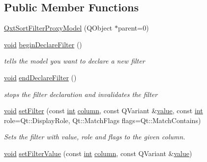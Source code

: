 \subsection*{Public Member Functions}
\begin{DoxyCompactItemize}
\item 
\hyperlink{class_qxt_sort_filter_proxy_model_acaf9aa94aadd029fc7888c5e70bcc32e}{Qxt\-Sort\-Filter\-Proxy\-Model} (Q\-Object $\ast$parent=0)
\item 
\hyperlink{group___u_a_v_objects_plugin_ga444cf2ff3f0ecbe028adce838d373f5c}{void} \hyperlink{class_qxt_sort_filter_proxy_model_aed9d7acfa357bec84ba07df45034c284}{begin\-Declare\-Filter} ()
\begin{DoxyCompactList}\small\item\em tells the model you want to declare a new filter \end{DoxyCompactList}\item 
\hyperlink{group___u_a_v_objects_plugin_ga444cf2ff3f0ecbe028adce838d373f5c}{void} \hyperlink{class_qxt_sort_filter_proxy_model_a17ba119b09788b58bcc08211fa6c3b81}{end\-Declare\-Filter} ()
\begin{DoxyCompactList}\small\item\em stops the filter declaration and invalidates the filter \end{DoxyCompactList}\item 
\hyperlink{group___u_a_v_objects_plugin_ga444cf2ff3f0ecbe028adce838d373f5c}{void} \hyperlink{class_qxt_sort_filter_proxy_model_ab256bfa0285cd326e6e6dbf6b4474b06}{set\-Filter} (const \hyperlink{ioapi_8h_a787fa3cf048117ba7123753c1e74fcd6}{int} \hyperlink{glext_8h_a3b58c39b1b7ca6f4012b27e84de3bdb3}{column}, const Q\-Variant \&\hyperlink{glext_8h_aa0e2e9cea7f208d28acda0480144beb0}{value}, const \hyperlink{ioapi_8h_a787fa3cf048117ba7123753c1e74fcd6}{int} role=Qt\-::\-Display\-Role, Qt\-::\-Match\-Flags flags=Qt\-::\-Match\-Contains)
\begin{DoxyCompactList}\small\item\em Sets the filter with {\itshape value}, {\itshape role} and {\itshape flags} to the given {\itshape column}. \end{DoxyCompactList}\item 
\hyperlink{group___u_a_v_objects_plugin_ga444cf2ff3f0ecbe028adce838d373f5c}{void} \hyperlink{class_qxt_sort_filter_proxy_model_a5ac90e29d8d7fb33639bacff6a3670ab}{set\-Filter\-Value} (const \hyperlink{ioapi_8h_a787fa3cf048117ba7123753c1e74fcd6}{int} \hyperlink{glext_8h_a3b58c39b1b7ca6f4012b27e84de3bdb3}{column}, const Q\-Variant \&\hyperlink{glext_8h_aa0e2e9cea7f208d28acda0480144beb0}{value})

\end{DoxyCompactItemize}
